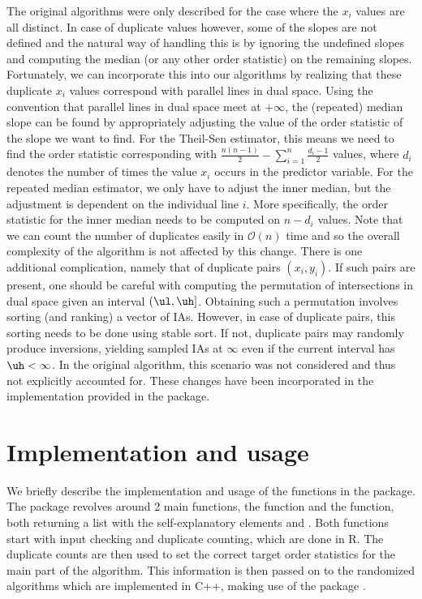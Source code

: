 The original algorithms were only described for the case where the $x_i$ values are all distinct. In case of duplicate values however, some of the slopes are not defined and the natural way of handling this is by ignoring the undefined slopes and computing the median (or any other order statistic) on the remaining slopes. Fortunately, we can incorporate this into our algorithms by realizing that these duplicate $x_i$ values correspond with parallel lines in dual space. Using the convention that parallel lines in dual space meet at $+\infty$, the (repeated) median slope can be found by appropriately adjusting the value of the order statistic of the slope we want to find. For the Theil-Sen estimator, this means we need to find the order statistic corresponding with $\frac{n(n-1)}{2}-\sum_{i=1}^n{\frac{d_i-1}{2}}$ values, where $d_i$ denotes the number of times the value $x_i$ occurs in the predictor variable. For the repeated median estimator, we only have to adjust the inner median, but the adjustment is dependent on the individual line $i$. More specifically, the order statistic for the inner median needs to be computed on $n-d_i$ values. Note that we can count the number of duplicates easily in $\mathcal{O}(n)$ time and so the overall complexity of the algorithm is not affected by this change. There is one additional complication, namely that of duplicate pairs $(x_i, y_i)$. If such pairs are present, one should be careful with computing the permutation of intersections in dual space given an interval $(\ul, \uh]$. Obtaining such a permutation involves sorting (and ranking) a vector of IAs. However, in case of duplicate pairs, this sorting needs to be done using stable sort. If not, duplicate pairs may randomly produce inversions, yielding sampled IAs at $\infty$ even if the current interval has $\uh < \infty$. In the original algorithm, this scenario was not considered and thus not explicitly accounted for. These changes have been incorporated in the implementation provided in the  package.


\section{Implementation and usage}\label{sec:impl}
We briefly describe the implementation and usage of the functions in the  package. The package revolves around 2 main functions, the  function and the  function, both returning a list with the self-explanatory elements  and . 
 Both functions start with input checking and duplicate counting, which are done in R. The duplicate counts are then used to set the correct target order statistics for the main part of the algorithm. This information is then passed on to the randomized algorithms which are implemented in C++, making use of the  package \citep{eddelbuettel2011rcpp, rcpparmadillo}. \par

